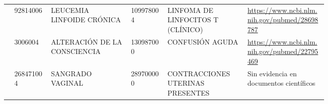 \begin{landscape}
\begin{longtable}[c]{@{}llp{0.25\linewidth}lp{0.25\linewidth}p{0.25\linewidth}@{}}
 & 92814006 & LEUCEMIA LINFOIDE CRÓNICA & 109978004 & LINFOMA DE LINFOCITOS T (CLÍNICO) & \url{https://www.ncbi.nlm.nih.gov/pubmed/28698787} \\
 & 3006004 & ALTERACIÓN DE LA CONSCIENCIA & 130987000 & CONFUSIÓN AGUDA & \url{https://www.ncbi.nlm.nih.gov/pubmed/22795469} \\
 & 268471004 & SANGRADO VAGINAL & 289700000 & CONTRACCIONES UTERINAS PRESENTES & Sin evidencia en documentos científicos \\* \cmidrule(l){2-6} 
\end{longtable}
\end{landscape}
\normalsize